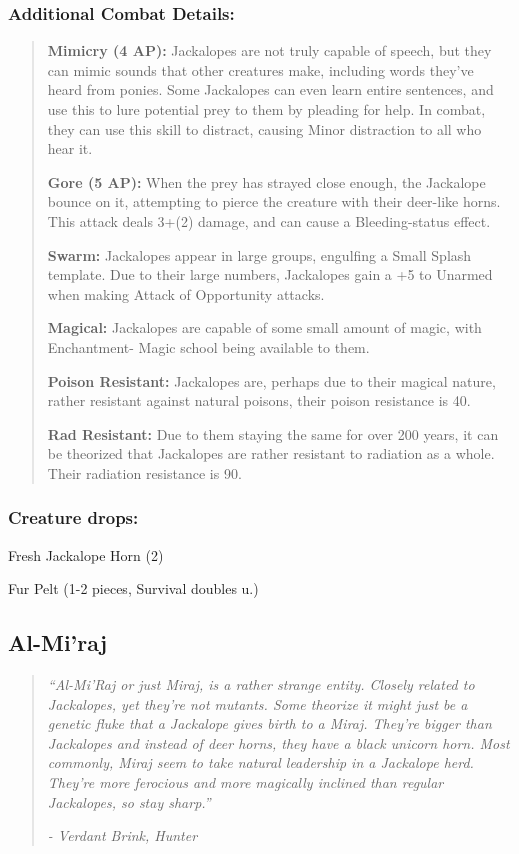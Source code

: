 \documentclass[11pt,a4paper,twocolumn]{book}
\begin{document}
	\subsubsection*{Additional Combat Details:}
	\begin{verse}
		\textbf{Mimicry (4 AP):} Jackalopes are not truly capable of speech, but they can mimic sounds that other creatures make, including words they've heard from ponies. Some Jackalopes can even learn entire sentences, and use this to lure potential prey to them by pleading for help. In combat, they can use this skill to distract, causing Minor distraction to all who hear it.
		
		\textbf{Gore (5 AP):} When the prey has strayed close enough, the Jackalope bounce on it, attempting to pierce the creature with their deer-like horns. This attack deals 3+(2) damage, and can cause a Bleeding-status effect.
		
		\textbf{Swarm:} Jackalopes appear in large groups, engulfing a Small Splash template. Due to their large numbers, Jackalopes gain a +5 to Unarmed when making Attack of Opportunity attacks.
		
		\textbf{Magical:} Jackalopes are capable of some small amount of magic, with Enchantment- Magic school being available to them.
		
		\textbf{Poison Resistant:} Jackalopes are, perhaps due to their magical nature, rather resistant against natural poisons, their poison resistance is 40.
		
		\textbf{Rad Resistant:} Due to them staying the same for over 200 years, it can be theorized that Jackalopes are rather resistant to radiation as a whole. Their radiation resistance is 90.
	\end{verse}
	
	\subsubsection*{Creature drops:}
	\begin{compactitem}
		\item Fresh Jackalope Horn (2)
		\item Fur Pelt (1-2 pieces, Survival doubles u.)
	\end{compactitem}
	
	\vfill
	\subsection*{Al-Mi'raj}
	\begin{quote}
		\emph{``Al-Mi'Raj or just Miraj, is a rather strange entity. Closely related to Jackalopes, yet they're not mutants. Some theorize it might just be a genetic fluke that a Jackalope gives birth to a Miraj. They're bigger than Jackalopes and instead of deer horns, they have a black unicorn horn. Most commonly, Miraj seem to take natural leadership in a Jackalope herd. They're more ferocious and more magically inclined than regular Jackalopes, so stay sharp.''}
		
		\emph{-	Verdant Brink, Hunter}
	\end{quote}
	
\end{document}
